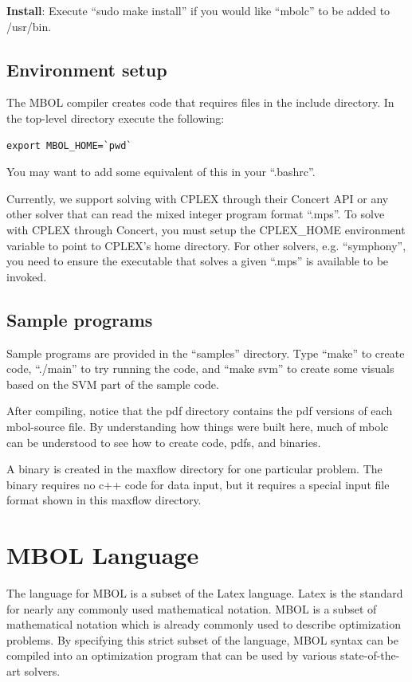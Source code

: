\documentclass{article}
\begin{document}
\textbf{Install}: Execute ``sudo make install'' if you would like ``mbolc'' to be added to /usr/bin.

\subsection{Environment setup}

The MBOL compiler creates code that requires files in the include directory. In the top-level directory execute the following:
\begin{verbatim}
export MBOL_HOME=`pwd`
\end{verbatim}
You may want to add some equivalent of this in your ``.bashrc''.

Currently, we support solving with CPLEX through their Concert API or any other solver that can read the mixed integer program format ``.mps''. To solve with CPLEX through Concert, you must setup the CPLEX\_HOME environment variable to point to CPLEX's home directory. For other solvers, e.g. ``symphony'', you need to ensure the executable that solves a given ``.mps'' is available to be invoked.

\subsection{Sample programs}

Sample programs are provided in the ``samples'' directory. Type ``make'' to create code, ``./main'' to try running the code, and ``make svm'' to create some visuals based on the SVM part of the sample code. 

After compiling, notice that the pdf directory contains the pdf versions of each mbol-source file. By understanding how things were built here, much of mbolc can be understood to see how to create code, pdfs, and binaries. 

A binary is created in the maxflow directory for one particular problem. The binary requires no c++ code for data input, but it requires a special input file format shown in this maxflow directory.

\section{MBOL Language}

The language for MBOL is a subset of the Latex language. Latex is the standard for nearly any commonly used mathematical notation. MBOL is a subset of mathematical notation which is already commonly used to describe optimization problems. By specifying this strict subset of the language, MBOL syntax can be compiled into an optimization program that can be used by various state-of-the-art solvers.
\end{document}
